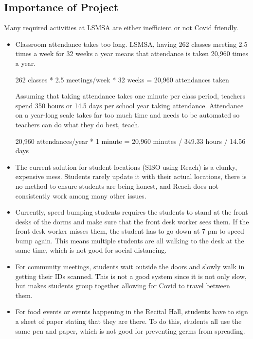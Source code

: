 \documentclass[12pt]{article}
\begin{document}
\begin{spacing}{1.2}
\subsection{Importance of Project}

Many required activities at LSMSA are either inefficient or not Covid friendly.
\begin{itemize}
	\item Classroom attendance takes too long. LSMSA, having 262 classes meeting 2.5 times a week for 32 weeks a year means that attendance is taken 20,960 times a year.
	\begin{center} 262 classes * 2.5 meetings/week * 32 weeks = 20,960 attendances taken \end{center}
Assuming that taking attendance takes one minute per class period, teachers spend 350 hours or 14.5 days per school year taking attendance. Attendance on a year-long scale takes far too much time and needs to be automated so teachers can do what they do best, teach.
	\begin{center} 20,960 attendances/year * 1 minute = 20,960 minutes / 349.33 hours / 14.56 days \end{center}
	\item The current solution for student locations (SISO using Reach) is a clunky, expensive mess. Students rarely update it with their actual locations, there is no method to ensure students are being honest, and Reach does not consistently work among many other issues.
	\item Currently, speed bumping students requires the students to stand at the front desks of the dorms and make sure that the front desk worker sees them. If the front desk worker misses them, the student has to go down at 7 pm to speed bump again. This means multiple students are all walking to the desk at the same time, which is not good for social distancing.
	\item For community meetings, students wait outside the doors and slowly walk in getting their IDs scanned. This is not a good system since it is not only slow, but makes students group together allowing for Covid to travel between them.
	\item For food events or events happening in the Recital Hall, students have to sign a sheet of paper stating that they are there. To do this, students all use the same pen and paper, which is not good for preventing germs from spreading.
\end{itemize}


\end{spacing}
\end{document}
